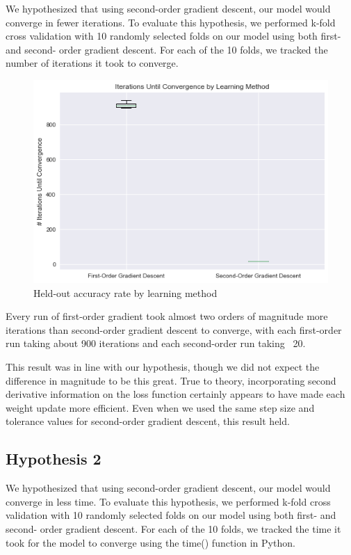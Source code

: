 \documentclass[11pt]{extarticle}
\begin{document}
We hypothesized that using second-order gradient descent, our model would converge in fewer iterations. To evaluate this hypothesis, we performed k-fold cross validation with 10 randomly selected folds on our model using both first- and second- order gradient descent. For each of the 10 folds, we tracked the number of iterations it took to converge.

\begin{figure}[h!]
\begin{center}
    \includegraphics[scale=.7]{iterations.png}
    \caption{Held-out accuracy rate by learning method}
     \label{fig:x}
\end{center}
\end{figure}

Every run of first-order gradient took almost two orders of magnitude more iterations than second-order gradient descent to converge, with each first-order run taking about 900 iterations and each second-order run taking ~20.

This result was in line with our hypothesis, though we did not expect the difference in magnitude to be this great. True to theory, incorporating second derivative information on the loss function certainly appears to have made each weight update more efficient. Even when we used the same step size and tolerance values for second-order gradient descent, this result held. 

\newpage

\subsection{Hypothesis 2}

We hypothesized that using second-order gradient descent, our model would converge in less time. To evaluate this hypothesis, we performed k-fold cross validation with 10 randomly selected folds on our model using both first- and second- order gradient descent. For each of the 10 folds, we tracked the time it took for the model to converge using the time() function in Python.
\end{document}
